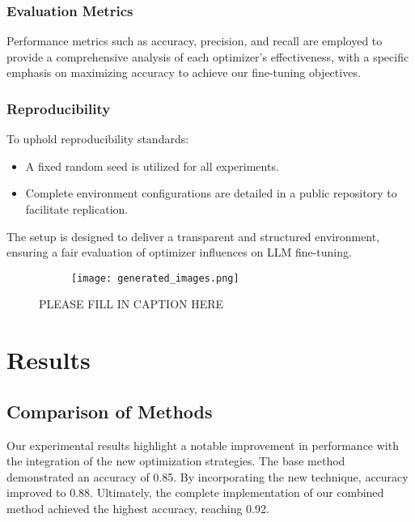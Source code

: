 \documentclass{article} %
\begin{document}
\subsubsection{Evaluation Metrics}

Performance metrics such as accuracy, precision, and recall are employed to provide a comprehensive analysis of each optimizer’s effectiveness, with a specific emphasis on maximizing accuracy to achieve our fine-tuning objectives.

\subsubsection{Reproducibility}

To uphold reproducibility standards:
\begin{itemize}
\item A fixed random seed is utilized for all experiments.
\item Complete environment configurations are detailed in a public repository to facilitate replication.
\end{itemize}

The setup is designed to deliver a transparent and structured environment, ensuring a fair evaluation of optimizer influences on LLM fine-tuning.

\begin{figure}[t]
    \centering
    \begin{subfigure}{0.9\textwidth}
        \texttt{[image: generated\_images.png]}
        \label{fig:diffusion-samples}
    \end{subfigure}
    \caption{PLEASE FILL IN CAPTION HERE}
    \label{fig:first_figure}
\end{figure}

\section{Results}
\label{sec:results}
\subsection{Comparison of Methods}

Our experimental results highlight a notable improvement in performance with the integration of the new optimization strategies. The base method demonstrated an accuracy of 0.85. By incorporating the new technique, accuracy improved to 0.88. Ultimately, the complete implementation of our combined method achieved the highest accuracy, reaching 0.92.
\end{document}
